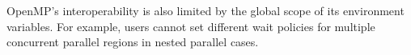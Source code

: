 OpenMP's interoperability is also limited by the global scope of 
its environment variables. For example, users cannot set different wait policies for 
multiple concurrent {\sf parallel} regions in nested parallel cases. 
